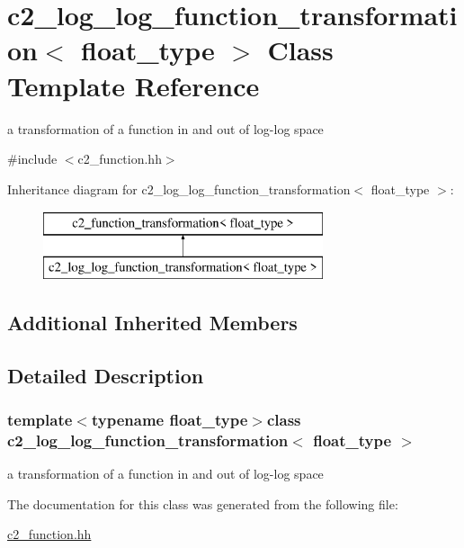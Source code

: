 \hypertarget{classc2__log__log__function__transformation}{\section{c2\-\_\-log\-\_\-log\-\_\-function\-\_\-transformation$<$ float\-\_\-type $>$ Class Template Reference}
\label{classc2__log__log__function__transformation}
}


a transformation of a function in and out of log-\/log space  




{\ttfamily \#include $<$c2\-\_\-function.\-hh$>$}

Inheritance diagram for c2\-\_\-log\-\_\-log\-\_\-function\-\_\-transformation$<$ float\-\_\-type $>$\-:\begin{figure}[H]
\begin{center}
\leavevmode
\includegraphics[height=2.000000cm]{classc2__log__log__function__transformation}
\end{center}
\end{figure}
\subsection*{Additional Inherited Members}


\subsection{Detailed Description}
\subsubsection*{template$<$typename float\-\_\-type$>$class c2\-\_\-log\-\_\-log\-\_\-function\-\_\-transformation$<$ float\-\_\-type $>$}

a transformation of a function in and out of log-\/log space 



The documentation for this class was generated from the following file\-:\begin{DoxyCompactItemize}
\item 
\hyperlink{c2__function_8hh}{c2\-\_\-function.\-hh}\end{DoxyCompactItemize}
